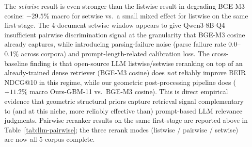 \documentclass[review,1p]{elsarticle}
\begin{document}
\begin{table}[h]
\centering
\small
\caption{Open-source LLM \emph{setwise} reranker on five BEIR corpora, NDCG@10 (open-source LLM setwise rerank baseline; cf.\ Section~\ref{subsec:llm-listwise} for the same baseline family in listwise mode). Qwen3-8B-Q4 reranks BGE-M3 audited-rebuild top-20 candidates per query via 4-document sliding-window setwise prompt (50\% overlap, $\le 16$ token output). ``vs.\ Cosine'' is relative gain over BGE-M3 cosine baseline. ``vs.\ Ours-GBM-11'' is relative gain over our pipeline's deployment-rule output (Table~\ref{tab:main}). Setwise reranking with a generic open-source LLM \emph{degrades} BGE-M3 cosine baseline on all five corpora (mean $-29.5\%$); our geometric pipeline (Ours-GBM-11) exceeds setwise reranking on every corpus, with the largest absolute margin on FiQA ($+0.171$ NDCG@10).}
\label{tab:llm-setwise}
\end{table}

The \emph{setwise} result is even stronger than the listwise result in degrading BGE-M3 cosine: $-29.5\%$ macro for setwise vs.\ a small mixed effect for listwise on the same first-stage. The 4-document setwise window appears to give Qwen3-8B-Q4 insufficient pairwise discrimination signal at the granularity that BGE-M3 cosine already captures, while introducing parsing-failure noise (parse failure rate 0.0--0.1\% across corpora) and prompt-length-related calibration loss. The cross-baseline finding is that open-source LLM listwise/setwise reranking on top of an already-trained dense retriever (BGE-M3 cosine) does \emph{not} reliably improve BEIR NDCG@10 in this regime, while our geometric post-processing pipeline does ($+11.2\%$ macro Ours-GBM-11 vs.\ BGE-M3 cosine). This is direct empirical evidence that geometric structural priors capture retrieval signal complementary to (and at this niche, more reliably effective than) prompt-based LLM relevance judgments. Pairwise reranker results on the same first-stage are reported above in Table~\ref{tab:llm-pairwise}; the three rerank modes (listwise / pairwise / setwise) are now all 5-corpus complete.
\end{document}
